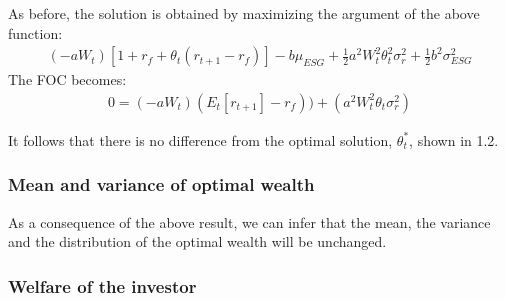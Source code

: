 \documentclass[12pt]{article}
\begin{document}
	As before, the solution is obtained by maximizing the argument of the above function: \vspace{-0.5em}
	\begin{align*}
		(-aW_t) [1 + r_f + \theta_t(r_{t+1}-r_f)] - b\mu_{ESG} +\frac{1}{2}a^2W_t^2\theta_t^2\sigma_r^2 + \frac{1}{2}b^2\sigma_{ESG}^2
	\end{align*}
	The FOC becomes:
	\begin{align*}
		0 = (-aW_t)(E_{t}[r_{t+1}]-r_f)) + (a^2W_t^2\theta_t\sigma_r^2)
	\end{align*} \vspace{-1.75em}
	
	It follows that there is no difference from the optimal solution, $\theta_{t}^*$, shown in 1.2. 
	\subsubsection{Mean and variance of optimal wealth}
	As a consequence of the above result, we can infer that the mean, the variance and the distribution of the optimal wealth will be unchanged.
	\subsubsection{Welfare of the investor}
	
\end{document}
